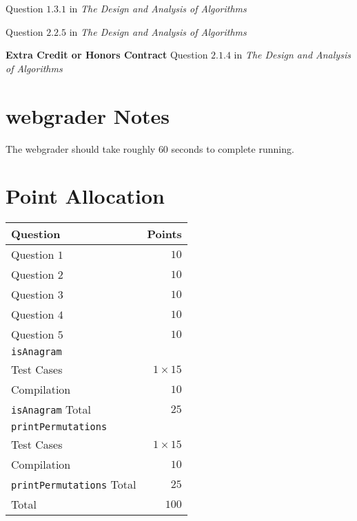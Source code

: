 \documentclass[addpoints,letter,11pt]{exam}
\begin{document}
\begin{questions}
  \question[10]
  Question $1.3.1$ in \emph{The Design and Analysis of Algorithms}

  \question[10]
  Question $2.2.5$ in \emph{The Design and Analysis of Algorithms}

  \question[10]
  \textbf{Extra Credit or Honors Contract}
  Question $2.1.4$ in \emph{The Design and Analysis of Algorithms}

\end{questions}

\section*{webgrader Notes}
The webgrader should take roughly $60$ seconds to complete running.

\section*{Point Allocation}
\begin{table}[H]
  \center
  \begin{tabular}{|l|r|}
    \hline
    Question & Points\\
    \hline
    \hline
    Question $1$ & $10$\\
    Question $2$ & $10$\\
    Question $3$ & $10$\\
    Question $4$ & $10$\\
    Question $5$ & $10$\\
    \hline
    \verb+isAnagram+ & \\
    Test Cases & $1\times 15$\\
    Compilation & $10$\\
    \verb+isAnagram+ Total & $25$\\
    \verb+printPermutations+ & \\
    Test Cases & $1\times 15$\\
    Compilation & $10$\\
    \verb+printPermutations+ Total & $25$\\
    \hline
    \hline
    Total & $100$\\
    \hline
  \end{tabular}
\end{table}
\end{document}
